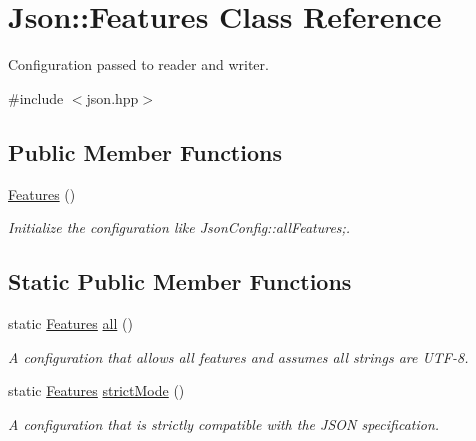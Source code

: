 \hypertarget{classJson_1_1Features}{}\section{Json\+:\+:Features Class Reference}
\label{classJson_1_1Features}


Configuration passed to reader and writer.  




{\ttfamily \#include $<$json.\+hpp$>$}

\subsection*{Public Member Functions}
\begin{DoxyCompactItemize}
\item 
\hyperlink{classJson_1_1Features_ad15a091cb61bb31323299a95970d2644}{Features} ()
\begin{DoxyCompactList}\small\item\em Initialize the configuration like Json\+Config\+::all\+Features;. \end{DoxyCompactList}\end{DoxyCompactItemize}
\subsection*{Static Public Member Functions}
\begin{DoxyCompactItemize}
\item 
static \hyperlink{classJson_1_1Features}{Features} \hyperlink{classJson_1_1Features_a63894da6e2c100b38741fa933f3d33ae}{all} ()
\begin{DoxyCompactList}\small\item\em A configuration that allows all features and assumes all strings are U\+T\+F-\/8. \end{DoxyCompactList}\item 
static \hyperlink{classJson_1_1Features}{Features} \hyperlink{classJson_1_1Features_ae23176c14b2e79e81fb61fb1a8ab58ee}{strict\+Mode} ()
\begin{DoxyCompactList}\small\item\em A configuration that is strictly compatible with the J\+S\+ON specification. \end{DoxyCompactList}\end{DoxyCompactItemize}
